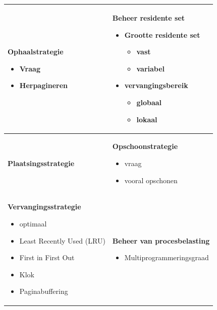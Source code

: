 \begin{table}[hp]
\begin{center}
  \begin{tabular}{| p{8cm} | p{8cm} | }
    \hline %
\textbf{Ophaalstrategie} 
\begin{itemize}
\item Vraag
\item Herpagineren
\end{itemize} & \textbf{Beheer residente set}
\begin{itemize}
    \item Grootte residente set
        \begin{itemize}
            \item vast
            \item variabel
        \end{itemize}
    \item vervangingsbereik
        \begin{itemize}
            \item globaal 
            \item lokaal
        \end{itemize}
\end{itemize}  \\ \hline
\textbf{Plaatsingsstrategie}
& \textbf{Opschoonstrategie}
\begin{itemize}
    \item vraag
    \item vooral opschonen
\end{itemize}  \\ \hline
\textbf{Vervangingsstrategie}
\begin{itemize}
    \item optimaal
    \item Least Recently Used (LRU)
    \item First in First Out
    \item Klok
    \item Paginabuffering
\end{itemize} 
& \textbf{Beheer van procesbelasting}
\begin{itemize}
    \item Multiprogrammeringsgraad
\end{itemize}  \\
    \hline
  \end{tabular}
\end{center}
\caption{}
\label{}
\end{table}
\endgroup

